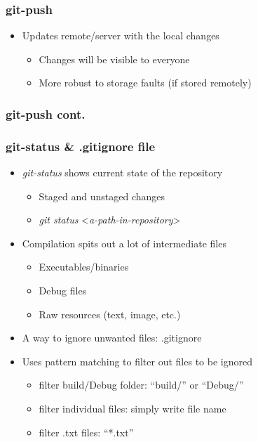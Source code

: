 \documentclass{beamer}
\begin{document}
\begin{frame}
  \frametitle{git-push}
  \begin{itemize}
  \item<1-> Updates remote/server with the local changes
    \begin{itemize}
    \item<2-> Changes will be visible to everyone
    \item<3-> More robust to storage faults (if stored remotely)
    \end{itemize}
  \end{itemize}
\end{frame}

\begin{frame}
  \frametitle{git-push cont.}
  {\centering
  }
\end{frame}

\begin{frame}
  \frametitle{git-status \& .gitignore file}
  \begin{itemize}
  \item<1-> \textit{git-status} shows current state of the repository
    \begin{itemize}
    \item<2-> Staged and unstaged changes
    \item<2->[] \textit{git status} {\textless}\textit{a-path-in-repository}{\textgreater}
    \end{itemize}
  \item<3-> Compilation spits out a lot of intermediate files
    \begin{itemize}
    \item<4-> Executables/binaries
    \item<4-> Debug files
    \item<4-> Raw resources (text, image, etc.)
    \end{itemize}
  \item<5-> A way to ignore unwanted files: .gitignore
  \item<6-> Uses pattern matching to filter out files to be ignored
    \begin{itemize}
    \item<7-> filter build/Debug folder: ``build/'' or ``Debug/''
    \item<8-> filter individual files: simply write file name
    \item<9-> filter .txt files: ``*.txt''
    \end{itemize}
  \end{itemize}
\end{frame}
\end{document}
